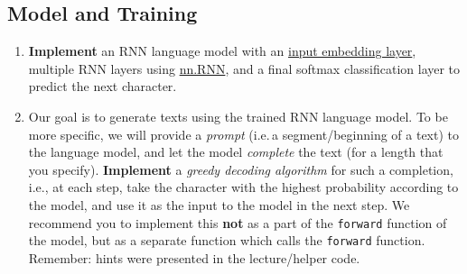 \documentclass[a4paper,11pt]{article}
\begin{document}
\subsection{Model and Training}
\begin{enumerate}
\item \textbf{Implement} an RNN language model with an
\href{https://pytorch.org/docs/stable/generated/torch.nn.Embedding.html}{input embedding layer},
multiple RNN layers using \href{https://pytorch.org/docs/stable/generated/torch.nn.RNN.html}{nn.RNN},
and a final softmax classification layer to predict the next character.

\item Our goal is to generate texts using the trained RNN language model.
To be more specific, we will provide a \textit{prompt} (i.e.\,a segment/beginning of a text) to the language model,
and let the model \textit{complete} the text (for a length that you specify).
\textbf{Implement} a \textit{greedy decoding algorithm} for such a completion, i.e., at each step, take the
character with the highest probability according to the model, and use it as the input to the model in the next step.
We recommend you to implement this \textbf{not} as a part of the \texttt{forward} function of the model,
but as a separate function which calls the \texttt{forward} function.
Remember: hints were presented in the lecture/helper code.




\end{enumerate}
\end{document}
